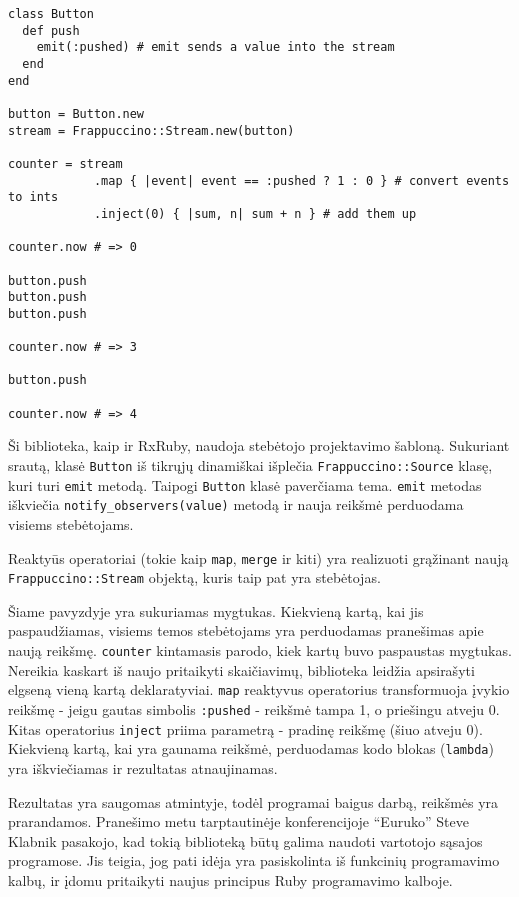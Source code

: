 \begin{lstlisting}[caption=``Frappuccino'' bibliotekos panaudojimo pavyzdys, label=frappuccino]
class Button
  def push
    emit(:pushed) # emit sends a value into the stream
  end
end

button = Button.new
stream = Frappuccino::Stream.new(button)

counter = stream
            .map { |event| event == :pushed ? 1 : 0 } # convert events to ints
            .inject(0) { |sum, n| sum + n } # add them up

counter.now # => 0

button.push
button.push
button.push

counter.now # => 3

button.push

counter.now # => 4
\end{lstlisting}

Ši biblioteka, kaip ir RxRuby, naudoja stebėtojo projektavimo šabloną. Sukuriant srautą, klasė \lstinline|Button| iš tikrųjų dinamiškai išplečia \lstinline|Frappuccino::Source| klasę, kuri turi \lstinline|emit| metodą. Taipogi \lstinline|Button| klasė paverčiama tema. \lstinline|emit| metodas iškviečia \lstinline|notify_observers(value)| metodą ir nauja reikšmė perduodama visiems stebėtojams.

Reaktyūs operatoriai (tokie kaip \lstinline|map|, \lstinline|merge| ir kiti) yra realizuoti grąžinant naują \lstinline|Frappuccino::Stream| objektą, kuris taip pat yra stebėtojas.

Šiame pavyzdyje yra sukuriamas mygtukas. Kiekvieną kartą, kai jis paspaudžiamas, visiems temos stebėtojams yra perduodamas pranešimas apie naują reikšmę. \lstinline|counter| kintamasis parodo, kiek kartų buvo paspaustas mygtukas. Nereikia kaskart iš naujo pritaikyti skaičiavimų, biblioteka leidžia apsirašyti elgseną vieną kartą deklaratyviai. \lstinline|map| reaktyvus operatorius transformuoja įvykio reikšmę - jeigu gautas simbolis \lstinline|:pushed| - reikšmė tampa 1, o priešingu atveju 0. Kitas operatorius \lstinline|inject| priima parametrą - pradinę reikšmę (šiuo atveju 0). Kiekvieną kartą, kai yra gaunama reikšmė, perduodamas kodo blokas (\lstinline|lambda|) yra iškviečiamas ir rezultatas atnaujinamas.

Rezultatas yra saugomas atmintyje, todėl programai baigus darbą, reikšmės yra prarandamos. Pranešimo metu tarptautinėje konferencijoje ``Euruko'' Steve Klabnik pasakojo, kad tokią biblioteką būtų galima naudoti vartotojo sąsajos programose. Jis teigia, jog pati idėja yra pasiskolinta iš funkcinių programavimo kalbų, ir įdomu pritaikyti naujus principus Ruby programavimo kalboje.

